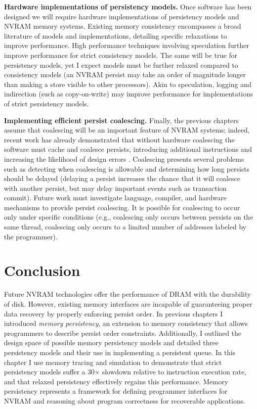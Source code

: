 \textbf{Hardware implementations of persistency models.}
Once software has been designed we will require hardware implementations of persistency models and NVRAM memory systems.
Existing memory consistency encompasses a broad literature of models and implementations, detailing specific relaxations to improve performance.
High performance techniques involving speculation further improve performance for strict consistency models.
The same will be true for persistency models, yet I expect models must be further relaxed compared to consistency models (an NVRAM persist may take an order of magnitude longer than making a store visible to other processors).
Akin to speculation, logging and indirection (such as copy-on-write) may improve performance for implementations of strict persistency models.

\textbf{Implementing efficient persist coalescing.}
Finally, the previous chapters assume that coalescing will be an important feature of NVRAM systems; indeed, recent work has already demonstrated that without hardware coalescing the software must cache and coalesce persists, introducing additional instructions and increasing the likelihood of design errors \cite{ConditNightingale09,FangHsiao11}.
Coalescing presents several problems such as detecting when coalescing is allowable and determining how long persists should be delayed (delaying a persist increases the chance that it will coalesce with another persist, but may delay important events such as transaction commit).
Future work must investigate language, compiler, and hardware mechanisms to provide persist coalescing.
It is possible for coalescing to occur only under specific conditions (e.g., coalescing only occurs between persists on the same thread, coalescing only occurs to a limited number of addresses labeled by the programmer).

\section{Conclusion}
\label{sec:PersistencyEval:Conclusion}

Future NVRAM technologies offer the performance of DRAM with the durability of disk.
However, existing memory interfaces are incapable of guaranteeing proper data recovery by properly enforcing persist order.
In previous chapters I introduced \emph{memory persistency}, an extension to memory consistency that allows programmers to describe persist order constraints.
Additionally, I outlined the design space of possible memory persistency models and detailed three persistency models and their use in implementing a persistent queue.
In this chapter I use memory tracing and simulation to demonstrate that strict persistency models suffer a 30$\times$ slowdown relative to instruction execution rate, and that relaxed persistency effectively regains this performance.
Memory persistency represents a framework for defining programmer interfaces for NVRAM and reasoning about program correctness for recoverable applications.

